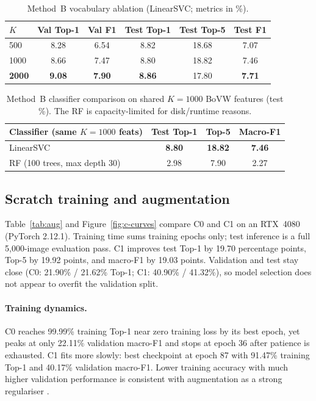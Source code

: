 \documentclass[10pt,twocolumn,letterpaper]{article}
\begin{document}
\begin{table}[t]
\centering
\footnotesize
\begin{tabular}{@{}lccccc@{}}
\toprule
$K$ & Val Top-1 & Val F1 & Test Top-1 & Test Top-5 & Test F1 \\
\midrule
500 & 8.28 & 6.54 & 8.82 & 18.68 & 7.07 \\
1000 & 8.66 & 7.47 & 8.80 & 18.82 & 7.46 \\
\textbf{2000} & \textbf{9.08} & \textbf{7.90} & \textbf{8.86} & 17.80 & \textbf{7.71} \\
\bottomrule
\end{tabular}
\caption{Method~B vocabulary ablation (LinearSVC; metrics in \%).}
\label{tab:bovw}
\end{table}

\begin{table}[t]
\centering
\footnotesize
\begin{tabular}{@{}lccc@{}}
\toprule
Classifier (same $K{=}1000$ feats) & Test Top-1 & Top-5 & Macro-F1 \\
\midrule
LinearSVC & \textbf{8.80} & \textbf{18.82} & \textbf{7.46} \\
RF (100 trees, max depth 30) & 2.98 & 7.90 & 2.27 \\
\bottomrule
\end{tabular}
\caption{Method~B classifier comparison on shared $K{=}1000$ BoVW features
(test \%). The RF is capacity-limited for disk/runtime reasons.}
\label{tab:b-clf}
\end{table}

\subsection{Scratch training and augmentation}

Table~\ref{tab:aug} and Figure~\ref{fig:c-curves} compare C0 and C1 on an
RTX~4080 (PyTorch 2.12.1). Training time sums training epochs only; test
inference is a full 5{,}000-image evaluation pass. C1 improves test Top-1 by
19.70 percentage points, Top-5 by 19.92 points, and macro-F1 by 19.03 points.
Validation and test stay close (C0: 21.90\% / 21.62\% Top-1; C1: 40.90\% /
41.32\%), so model selection does not appear to overfit the validation split.

\paragraph{Training dynamics.}
C0 reaches 99.99\% training Top-1 near zero training loss by its best epoch,
yet peaks at only 22.11\% validation macro-F1 and stops at epoch 36 after
patience is exhausted. C1 fits more slowly: best checkpoint at epoch 87 with
91.47\% training Top-1 and 40.17\% validation macro-F1. Lower training
accuracy with much higher validation performance is consistent with
augmentation as a strong regulariser \cite{shorten2019augmentation}.
\end{document}
